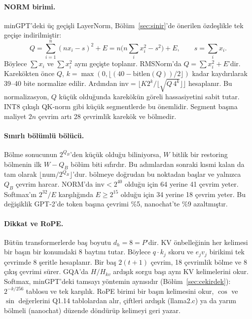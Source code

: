 \paragraph{NORM birimi.} minGPT'deki üç geçişli LayerNorm, Bölüm~\ref{sec:sinir}'de önerilen özdeşlikle tek geçişe indirilmiştir:
\begin{equation}
  Q = \sum_{i=1}^{n} (n x_i - s)^2 + E = n\Big(n\sum_i x_i^2 - s^2\Big) + E, \qquad s = \sum_i x_i .
\end{equation}
Böylece $\sum x_i$ ve $\sum x_i^2$ aynı geçişte toplanır. RMSNorm'da $Q=\sum x_i^2 + E$'dir. Karekökten önce $Q$, $k=\max(0,\lfloor(40-\mathrm{bitlen}(Q))/2\rfloor)$ kadar kaydırılarak 39--40 bite normalize edilir. Ardından $\mathrm{inv} = \lfloor K 2^k / \lfloor\sqrt{Q\,4^k}\rfloor\rfloor$ hesaplanır. Bu normalizasyon, $Q$ küçük olduğunda karekökün göreli hassasiyetini sabit tutar. INT8 çıkışlı QK-norm gibi küçük segmentlerde bu önemlidir. Segment başına maliyet $2n$ çevrim artı 28 çevrimlik karekök ve bölmedir.

\paragraph{Sınırlı bölümlü bölücü.} Bölme sonucunun $2^{Q_B}$'den küçük olduğu biliniyorsa, $W$ bitlik bir restoring bölmenin ilk $W-Q_B$ bölüm biti sıfırdır. Bu adımlardan sonraki kısmi kalan da tam olarak $\lfloor \mathrm{num}/2^{Q_B}\rfloor$'dur.  bölmeye doğrudan bu noktadan başlar ve yalnızca $Q_B$ çevrim harcar. NORM'da $\mathrm{inv} < 2^{40}$ olduğu için 64 yerine 41 çevrim yeter. Softmax'ın $2^{32}/E$ karşılığında $E \ge 2^{15}$ olduğu için 34 yerine 18 çevrim yeter. Bu değişiklik GPT-2'de token başına çevrimi \%5, nanochat'te \%9 azaltmıştır.

\paragraph{Dikkat ve RoPE.} Bütün transformerlerde baş boyutu $d_h = 8 = P$'dir. KV önbelleğinin her kelimesi bir başın bir konumdaki 8 baytını tutar. Böylece $q\cdot k_j$ skoru ve $e_j v_j$ birikimi tek çevrimde 8 şeritle hesaplanır. Bir baş $2(t+1)$ çevrim, 18 çevrimlik bölme ve 8 çıkış çevrimi sürer. GQA'da $H/H_{kv}$ ardışık sorgu başı aynı KV kelimelerini okur. Softmax, minGPT'deki tamsayı yöntemin aynısıdır (Bölüm~\ref{sec:cekirdek}): $2^{-k/256}$ tablosu ve tek karşılık. RoPE birimi bir başın kelimesini okur, $\cos$ ve $\sin$ değerlerini Q1.14 tablolardan alır, çiftleri ardışık (llama2.c) ya da yarım bölmeli (nanochat) düzende döndürüp kelimeyi geri yazar.

